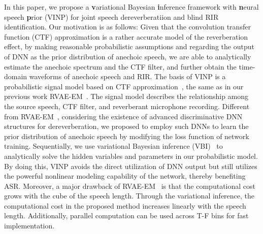 In this paper, we propose a \textbf{v}ariational Bayesian \textbf{i}nference framework with \textbf{n}eural speech \textbf{p}rior (VINP) for joint speech dereverberatiion and blind RIR identification.
Our motivation is as follows: Given that the convolution transfer function (CTF) approximation is a rather accurate model of the reverberation effect,
by making reasonable probabilistic assumptions and regarding the output of DNN as the prior distribution of anechoic speech, we are able to analytically estimate the anechoic spectrum and the CTF filter, and further obtain the time-domain waveforms of anechoic speech and RIR.
The basis of VINP is a probabilistic signal model based on CTF approximation~\cite{talmon2009relative}, the same as in our previous work RVAE-EM~\cite{wang2024rvae}.
The signal model describes the relationship among the source speech, CTF filter, and reverberant microphone recording.
Different from RVAE-EM~\cite{wang2024rvae}, considering the existence of advanced discriminative DNN structures for dereverberation, we proposed to employ such DNNs to learn the prior distribution of anechoic speech by modifying the loss function of network training. 
Sequentially, we use variational Bayesian inference (VBI)~\cite{beal2003variational,tzikas2008variational} to analytically solve the hidden variables and parameters in our probabilistic model.
By doing this, VINP avoids the direct utilization of DNN output but still utilizes the powerful nonlinear modeling capability of the network, thereby benefiting ASR.
Moreover, a major drawback of RVAE-EM~\cite{wang2024rvae} is that the computational cost grows with the cube of the speech length. 
Through the variational inference, the computational cost in the proposed method increases linearly with the speech length.
Additionally, parallel computation can be used across T-F bins for fast implementation.


